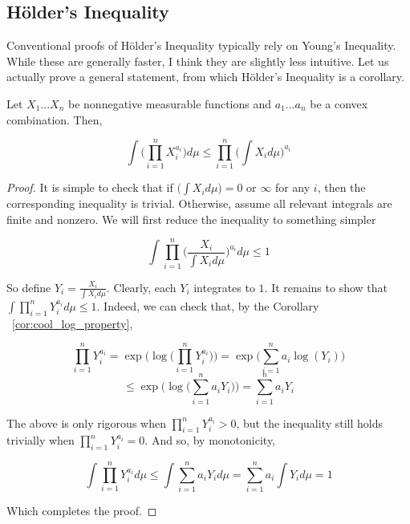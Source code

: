     \subsection{Hölder's Inequality}

    Conventional proofs of Hölder's Inequality typically rely 
    on Young's Inequality. While these are generally faster, I think they 
    are slightly less intuitive. Let us actually prove a general statement, 
    from which Hölder's Inequality is a corollary. 

    \begin{theorem}
        Let $X_1...X_n$ be nonnegative measurable functions and 
        $a_1...a_n$ be a convex combination. Then, 

        \[ \int\bigg(\prod_{i=1}^n X_i^{a_i}\bigg)d\mu \leq \prod_{i=1}^n \bigg(\int X_i d\mu \bigg)^{a_i}  \]
    \end{theorem}

    \begin{proof}
        It is simple to check that if $\bigg(\int X_i d\mu \bigg) = 0$ or $\infty$ for any 
        $i$, then the corresponding inequality is trivial. Otherwise, assume all relevant integrals 
        are finite and nonzero. We will first reduce the inequality to something simpler

        \[ \int \prod_{i=1}^n \bigg(\frac{X_i}{\int X_i d\mu} \bigg)^{a_i}d\mu  \leq 1 \]

        So define $Y_i = \frac{X_i}{\int X_i d\mu}$. Clearly, each $Y_i$ integrates 
        to $1$. It remains to show that $\int \prod_{i=1}^n Y_i^{a_i} d\mu \leq 1$. Indeed, 
        we can check that, by the Corollary ~\ref{cor:cool_log_property},
        
        \[ \prod_{i=1}^n Y_i^{a_i} = \exp\bigg(\log\bigg(\prod_{i=1}^n Y_i^{a_i}\bigg) \bigg)= \exp\bigg( \sum_{i=1}^n a_i \log(Y_i) \bigg) \]
        \[ \leq \exp\bigg(\log\bigg(\sum_{i=1}^n a_i Y_i \bigg)\bigg) = \sum_{i=1}^n a_i Y_i \]

        The above is only rigorous when $\prod_{i=1}^n Y_i^{a_i} > 0$, but the inequality still 
        holds trivially when $\prod_{i=1}^n Y_i^{a_i} = 0$. And so, by 
        monotonicity, 

        \[ \int \prod_{i=1}^n Y_i^{a_i} d\mu \leq \int \sum_{i=1}^n a_i Y_i d\mu = \sum_{i=1}^n a_i \int Y_i d\mu = 1 \]

        Which completes the proof.

    \end{proof}

